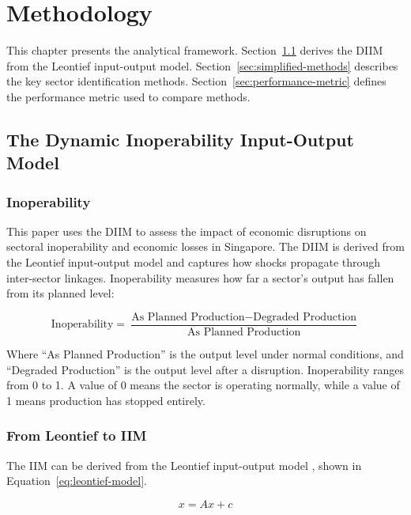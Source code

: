 \chapter{Methodology}

This chapter presents the analytical framework. Section~\ref{sec:diim-derivation} derives the DIIM from the Leontief input-output model. Section~\ref{sec:simplified-methods} describes the key sector identification methods. Section~\ref{sec:performance-metric} defines the performance metric used to compare methods.

\section{The Dynamic Inoperability Input-Output Model}
\label{sec:diim-derivation}

\subsection{Inoperability}

This paper uses the DIIM to assess the impact of economic disruptions on sectoral inoperability and economic losses in Singapore. The DIIM is derived from the Leontief input-output model and captures how shocks propagate through inter-sector linkages. Inoperability measures how far a sector's output has fallen from its planned level:

\begin{equation}
    \label{eq:inoperability-definition}
    \text{Inoperability} = \frac{\text{As Planned Production} - \text{Degraded Production}}{\text{As Planned Production}}
\end{equation}

Where ``As Planned Production'' is the output level under normal conditions, and ``Degraded Production'' is the output level after a disruption. Inoperability ranges from 0 to 1. A value of 0 means the sector is operating normally, while a value of 1 means production has stopped entirely.

\subsection{From Leontief to IIM}

The IIM can be derived from the Leontief input-output model \cite{Leontief1936}, shown in Equation~\eqref{eq:leontief-model}.

\begin{equation}
    x = A x + c
    \label{eq:leontief-model}
\end{equation}


